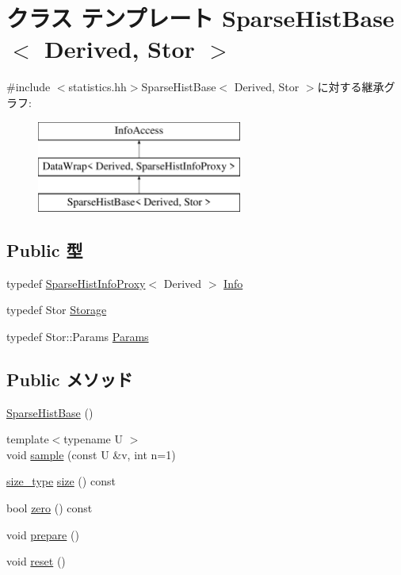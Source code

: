\hypertarget{classStats_1_1SparseHistBase}{
\section{クラス テンプレート SparseHistBase$<$ Derived, Stor $>$}
\label{classStats_1_1SparseHistBase}
}


{\ttfamily \#include $<$statistics.hh$>$}SparseHistBase$<$ Derived, Stor $>$に対する継承グラフ:\begin{figure}[H]
\begin{center}
\leavevmode
\includegraphics[height=3cm]{classStats_1_1SparseHistBase}
\end{center}
\end{figure}
\subsection*{Public 型}
\begin{DoxyCompactItemize}
\item 
typedef \hyperlink{classStats_1_1SparseHistInfoProxy}{SparseHistInfoProxy}$<$ Derived $>$ \hyperlink{classStats_1_1SparseHistBase_a0af9f4fe80bc5e1ee0b1d79bd353c504}{Info}
\item 
typedef Stor \hyperlink{classStats_1_1SparseHistBase_a5d4a6db0e7c32292f54a08d05c671bd1}{Storage}
\item 
typedef Stor::Params \hyperlink{classStats_1_1SparseHistBase_a24c5f88dc162c95e0b32ade67a7ea674}{Params}
\end{DoxyCompactItemize}
\subsection*{Public メソッド}
\begin{DoxyCompactItemize}
\item 
\hyperlink{classStats_1_1SparseHistBase_a163ae27d7bb5475e6d6ed7af40c4e050}{SparseHistBase} ()
\item 
{\footnotesize template$<$typename U $>$ }\\void \hyperlink{classStats_1_1SparseHistBase_afed4e1e09f566c5aa9e972d8c17b5a27}{sample} (const U \&v, int n=1)
\item 
\hyperlink{namespaceStats_ada51e68d31936547d3729c82daf6b7c6}{size\_\-type} \hyperlink{classStats_1_1SparseHistBase_a503ab01f6c0142145d3434f6924714e7}{size} () const 
\item 
bool \hyperlink{classStats_1_1SparseHistBase_a4e72b01b727d3165e75cba84eb507491}{zero} () const 
\item 
void \hyperlink{classStats_1_1SparseHistBase_a1825b40ca3bc3a1ba67fdb58fac5015c}{prepare} ()
\item 
void \hyperlink{classStats_1_1SparseHistBase_ad20897c5c8bd47f5d4005989bead0e55}{reset} ()
\end{DoxyCompactItemize}
